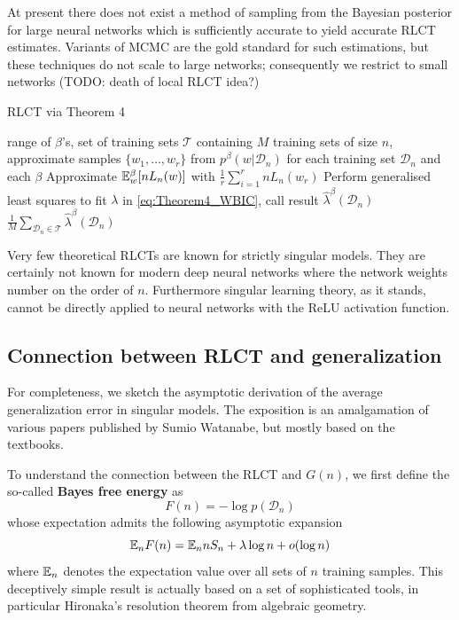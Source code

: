 \documentclass{article} %
\begin{document}
At present there does not exist a method of sampling from the Bayesian posterior for large neural networks which is sufficiently accurate to yield accurate RLCT estimates. Variants of MCMC are the gold standard for such estimations, but these techniques do not scale to large networks; consequently we restrict to small networks (TODO: death of local RLCT idea?)

\begin{algorithm}[tb]
	\caption{RLCT via Theorem 4}
	\label{alg:thm4}
	\begin{algorithmic}
		 range of $\beta$'s, set of training sets $\mathcal T$ containing $M$ training sets of size $n$, approximate samples $\{w_1,\ldots,w_r\}$ from $p^\beta(w|\mathcal D_n)$ for each training set $\mathcal D_n$ and each $\beta$
        		\STATE Approximate ${\mathbb{E}}_w^\beta [nL_n(w)]$ with $\frac{1}{r} \sum_{i=1}^r nL_n(w_r)$
    		\ENDFOR
    		\STATE Perform generalised least squares to fit $\lambda$ in \eqref{eq:Theorem4_WBIC}, call result $\hat \lambda^\beta(\mathcal D_n)$
		\ENDFOR
		 $\frac{1}{M} \sum_{\mathcal D_n \in \mathcal T} \hat \lambda^\beta(\mathcal D_n)$
	\end{algorithmic}
\end{algorithm}

Very few theoretical RLCTs are known for strictly singular models. They are certainly not known for modern deep neural networks where the network weights number on the order of $n$. Furthermore singular learning theory, as it stands, cannot be directly applied to neural networks with the ReLU activation function. 

\subsection{Connection between RLCT and generalization} \label{appendix:generalization_theory}
For completeness, we sketch the asymptotic derivation of the average generalization error in singular models. The exposition is an amalgamation of various papers published by Sumio Watanabe, but mostly based on the textbooks. 

To understand the connection between the RLCT and $G(n)$, we first define the so-called \textbf{Bayes free energy} as 
\[
F(n) = -\log p(\mathcal D_n)
\]
whose expectation admits the following asymptotic expansion \cite{watanabe_algebraic_2009}
\[
{\mathbb{E}}_n F(n) =  {\mathbb{E}}_n n S_n + \lambda \log n + o(\log n)
\]
where ${\mathbb{E}}_n$ denotes the expectation value over all sets of $n$ training samples. This deceptively simple result is actually based on a set of sophisticated tools, in particular Hironaka's resolution theorem from algebraic geometry.
\end{document}
